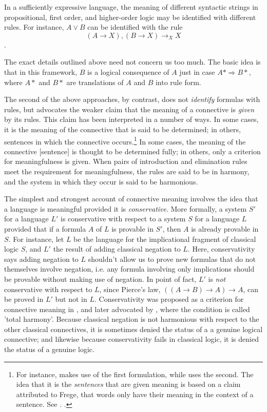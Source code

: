 	In a sufficiently expressive language, the meaning of different syntactic strings in propositional, first order, and higher-order logic may be identified with different rules. For instance, $A\vee B$ can be identified with the rule \[(A\rightarrow X), (B\rightarrow X) \rightarrow_{X} X\]. 
	
	The exact details outlined above need not concern us too much. The basic idea is that in this framework, $B$ is a logical consequence of $A$ just in case $A* \Rightarrow B*$, where $A*$ and $B*$ are translations of $A$ and $B$ into rule form.
	
	The second of the above approaches, by contrast, does not  \textit{identify} formulas with rules, but advocates the weaker claim that the meaning of a connective is \textit{given} by its rules. This claim has been interpreted in a number of ways. In some cases, it is the meaning of the connective that is said to be determined; in others, sentences in which the connective occurs.\footnote{For instance, \cite{Read2010} makes use of the first formulation, while \cite[162]{Prawitz1985} uses the second. The idea that it is the \textit{sentences} that are given meaning is based on a claim attributed to Frege, that words only have their meaning in the context of a sentence. See \cite{Frege1948}. \cite[308]{Davidson1967}.} In some cases, the meaning of the connective [sentence] is thought to be determined fully; in others, only a criterion for meaningfulness is given. When pairs of introduction and elimination rules meet the requirement for meaningfulness, the rules are said to be in harmony, and the system in which they occur is said to be harmonious.
	
	The simplest and strongest account of connective meaning involves the idea that a language is meaningful provided it is \textit{conservative}. More formally, a system $S'$ for a language $L'$ is conservative with respect to a system $S$ for a language $L$ provided that if a formula $A$ of $L$ is provable in $S'$, then $A$ is already provable in $S$. For instance, let $L$ be the language for the implicational fragment of classical logic $S$, and $L'$ the result of adding classical negation to $L$. Here, conservativity says adding negation to $L$ shouldn't allow us to prove new formulas that do not themselves involve negation, i.e. any formula involving only implications should be provable without making use of negation. In point of fact, $L'$ is \textit{not} conservative with respect to $L$, since Pierce's law, $((A\rightarrow B)\rightarrow A) \rightarrow A$, can be proved in $L'$ but not in $L$. Conservativity was proposed as a criterion for connective meaning in \cite{Belnap1962}, and later advocated by \cite{Dummett1991}, where the condition is called 'total harmony'. Because classical negation is not harmonious with respect to the other classical connectives, it is sometimes denied the status of a a genuine logical connective; and likewise because conservativity fails in classical logic, it is denied the status of a genuine logic.
	
